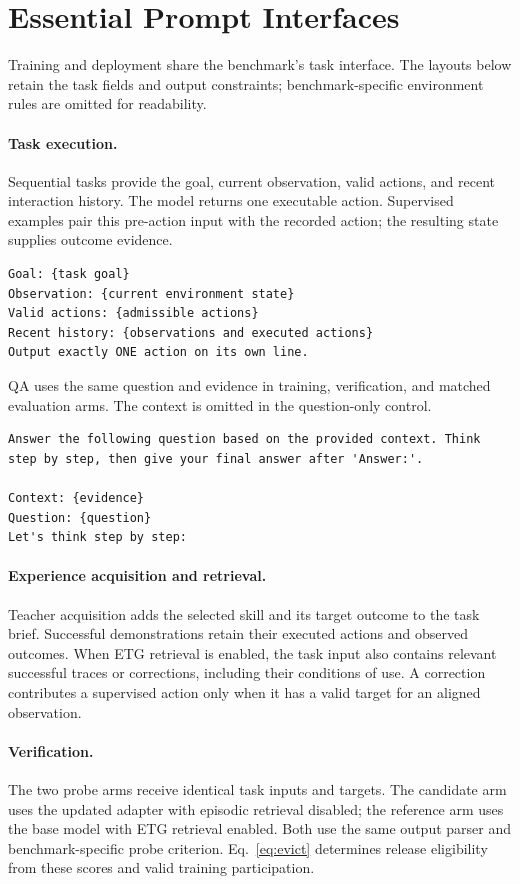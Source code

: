 \section{Essential Prompt Interfaces}
\label{app:prompts}
Training and deployment share the benchmark's task interface. The layouts below retain the task fields and output constraints; benchmark-specific environment rules are omitted for readability.

\lstset{style=engprompt}

\paragraph{Task execution.}
Sequential tasks provide the goal, current observation, valid actions, and recent interaction history. The model returns one executable action. Supervised examples pair this pre-action input with the recorded action; the resulting state supplies outcome evidence.
\begin{lstlisting}
Goal: {task goal}
Observation: {current environment state}
Valid actions: {admissible actions}
Recent history: {observations and executed actions}
Output exactly ONE action on its own line.
\end{lstlisting}

QA uses the same question and evidence in training, verification, and matched evaluation arms. The context is omitted in the question-only control.
\begin{lstlisting}
Answer the following question based on the provided context. Think step by step, then give your final answer after 'Answer:'.

Context: {evidence}
Question: {question}
Let's think step by step:
\end{lstlisting}

\paragraph{Experience acquisition and retrieval.}
Teacher acquisition adds the selected skill and its target outcome to the task brief. Successful demonstrations retain their executed actions and observed outcomes. When ETG retrieval is enabled, the task input also contains relevant successful traces or corrections, including their conditions of use. A correction contributes a supervised action only when it has a valid target for an aligned observation.

\paragraph{Verification.}
The two probe arms receive identical task inputs and targets. The candidate arm uses the updated adapter with episodic retrieval disabled; the reference arm uses the base model with ETG retrieval enabled. Both use the same output parser and benchmark-specific probe criterion. Eq.~\eqref{eq:evict} determines release eligibility from these scores and valid training participation.
